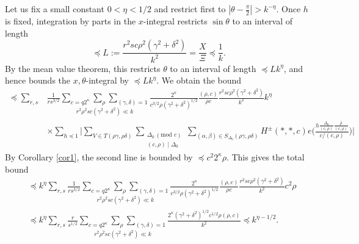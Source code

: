 \documentclass[11pt]{amsart}
\numberwithin{equation}{section}
\theoremstyle{plain}
\theoremstyle{definition}
\numberwithin{equation}{section}
\begin{document}

Let us fix a small constant $0 < \eta < 1/2$ and  restrict first to $|\theta - \frac{\pi}{2}| > k^{-\eta}$. Once $h$ is fixed,  integration by parts in the $x$-integral restricts $\sin \theta$ to an interval of length $$\preccurlyeq L := \frac{r^2 s c \rho^2 (\gamma^2 + \delta^2)}{k^2} = \frac{X}{\Xi} \preccurlyeq \frac{1}{k}.$$  By the mean value theorem, this restricts $\theta$  to an interval of length $\preccurlyeq L k^{\eta}$, and   hence bounds the $x, \theta$-integral by $\preccurlyeq L k^{\eta}$.  %
We obtain the bound
\begin{align}
\preccurlyeq   \sum_{r, s} &\frac{1}{rs^{3/2}} \underset{r^2 \rho^2 s c (\gamma^2 + \delta^2) \ll k }{\sum_{c = q2^{\kappa}} \sum_{\rho}\sum_{(\gamma, \delta) = 1}  }    \frac{2^{\kappa}}{c^{3/2} \rho(\gamma^2 + \delta^2)^{1/2}} \frac{(\rho, c)}{\rho c} \frac{r^2 s c \rho^2 (\gamma^2 + \delta^2)}{k^2} k^{\eta}  \\
& \times \sum_{h \preccurlyeq 1} \Big|\sum_{V \in T(\rho\gamma, \rho\delta)}   \sum_{\substack{\Delta_0\, (\text{mod } c)\\ (c, \rho) \mid \Delta_0 }}   \sum_{(\alpha, \beta) \in S_{\Delta_0}(\rho\gamma, \rho\delta)} %
H^{\pm}(*, *, c)
e\Big( \frac{h \frac{\Delta_0}{(c, \rho)} \overline{\frac{\rho}{(c, \rho)}}}{c/(c, \rho)}\Big) \Big|  
\end{align}
By Corollary \ref{cor1}, the second line is bounded by $\preccurlyeq c^2 2^{\kappa} \rho$. This gives the total bound
\begin{equation}\label{1b}
\begin{split}
& \preccurlyeq  k^{\eta} \sum_{r, s} \frac{1}{rs^{3/2}} \underset{r^2 \rho^2 s c (\gamma^2 + \delta^2) \ll k }{\sum_{c=q2^{\kappa}} \sum_{\rho}\sum_{(\gamma, \delta) = 1}  }    \frac{2^{\kappa}}{c^{3/2} \rho(\gamma^2 + \delta^2)^{1/2}} \frac{(\rho, c)}{\rho c} \frac{r^2 s c \rho^2 (\gamma^2 + \delta^2)}{k^2}  c^2 \rho \\
&\preccurlyeq  k^{\eta}  \sum_{r, s} \frac{r}{s^{1/2}} \underset{r^2 \rho^2 s c (\gamma^2 + \delta^2) \ll k }{\sum_{c=q2^{\kappa}} \sum_{\rho}\sum_{(\gamma, \delta) = 1}  }        \frac{  2^{\kappa}  (\gamma^2 + \delta^2)^{1/2} c^{1/2} \rho(\rho, c)}{k^2}  \preccurlyeq k^{\eta -1/2}. 
\end{split}
\end{equation}
\end{document}
